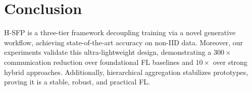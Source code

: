 \section{Conclusion}
    H-SFP is a three-tier framework decoupling training via a novel generative workflow, achieving state-of-the-art accuracy on non-IID data. Moreover, our experiments validate this ultra-lightweight design, demonstrating a $300\times$ communication reduction over foundational FL baselines and $10 \times$ over strong hybrid approaches. Additionally, hierarchical aggregation stabilizes prototypes, proving it is a stable, robust, and practical FL.